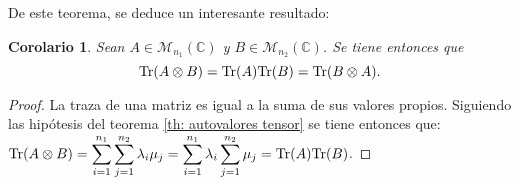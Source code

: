 \documentclass[11pt,a4paper,twoside,pdf]{article}
\numberwithin{equation}{section}
\newtheorem{corollary}{Corolario}
\begin{document}
		De este teorema, se deduce un interesante resultado:
		\begin{corollary} \label{cor: traza del producto}
			Sean $A\in \mathcal{M}_{n_1}(\mathbb{C})$ y $B\in \mathcal{M}_{n_2}(\mathbb{C})$. Se tiene entonces que \[ \textup{Tr}(A\otimes B) = \textup{Tr}(A) \textup{Tr}(B) = \textup{Tr}(B\otimes A) . \]
		\end{corollary}	
		
		\begin{proof}
			La traza de una matriz es igual a la suma de sus valores propios. Siguiendo las hipótesis del teorema \ref{th: autovalores tensor} se tiene entonces que:\\
			\hspace*{3cm}$\textup{Tr}(A\otimes B) = \displaystyle\sum_{i=1}^{n_1} \displaystyle\sum_{j=1}^{n_2} \lambda_i\mu_j = \displaystyle\sum_{i=1}^{n_1} \lambda_i \displaystyle\sum_{j=1}^{n_2} \mu_j = \textup{Tr}(A)\textup{Tr}(B)$.
		\end{proof}	
		
\end{document}

